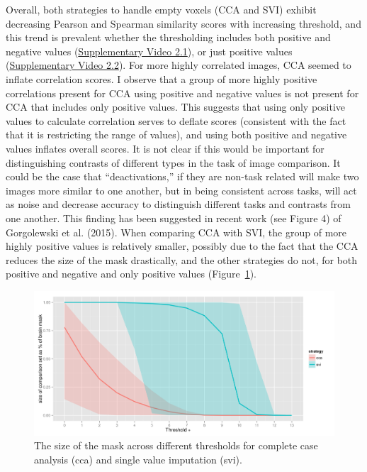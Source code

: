 \documentclass{report}
\begin{document}
Overall, both strategies to handle empty voxels (CCA and SVI) exhibit
decreasing Pearson and Spearman similarity scores with increasing
threshold, and this trend is prevalent whether the thresholding includes
both positive and negative values (\href{https://github.com/vsoch/thesis/blob/master/supplementary/chapter2/supp_figure1A.avi}{Supplementary Video 2.1}), or just
positive values (\href{https://github.com/vsoch/thesis/blob/master/supplementary/chapter2/supp_figure1B.avi}{Supplementary Video 2.2}). For more highly correlated
images, CCA seemed to inflate correlation scores. I observe that a group
of more highly positive correlations present for CCA using positive and
negative values is not present for CCA that includes only positive
values. This suggests that using only positive values to calculate
correlation serves to deflate scores (consistent with the fact that it
is restricting the range of values), and using both positive and
negative values inflates overall scores. It is not clear if this would
be important for distinguishing contrasts of different types in the task
of image comparison. It could be the case that ``deactivations,'' if
they are non-task related will make two images more similar to one
another, but in being consistent across tasks, will act as noise and
decrease accuracy to distinguish different tasks and contrasts from one
another. This finding has been suggested in recent work (see Figure 4)
of Gorgolewski et al. (2015). When comparing CCA with SVI, the group of
more highly positive values is relatively smaller, possibly due to the
fact that the CCA reduces the size of the mask drastically, and the
other strategies do not, for both positive and negative and
only positive values (Figure~\ref{fig:22}).

\begin{figure}[ht!]
\begin{center}
\includegraphics[width=15cm]{images/figure22.png}
\end{center}
\caption{\label{fig:22} The size of the mask across different thresholds for complete case analysis (cca) and single value imputation (svi).}
\end{figure}
\end{document}
